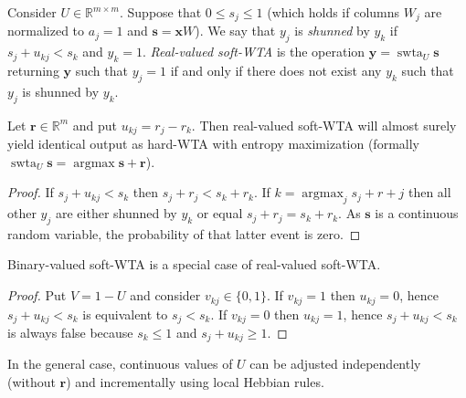 \documentclass[oneside,english,logo]{amuthesis}
\DeclareMathOperator*{\argmax}{argmax}
\DeclareMathOperator{\swta}{swta}
\begin{document}
\begin{definition}
Consider $U \in \mathbb{R}^{m\times m}$. Suppose that $0\le s_j\le 1$ (which holds if columns $W_j$ are normalized to $a_j=1$ and $\boldsymbol{s}=\boldsymbol{x} W$). 
We say that $y_j$ is \textit{shunned} by $y_k$ if $s_j+u_{kj}<s_k$ and $y_k=1$. 
\textit{Real-valued soft-WTA} is the operation $\boldsymbol{y}=\swta_U \boldsymbol{s}$ returning $\boldsymbol{y}$ such that $y_j=1$ if and only if there does not exist any $y_k$ such that  $y_j$ is shunned by $y_k$.
\label{definition:real_valued_swta}
\end{definition}
\begin{theorem}
Let $\boldsymbol{r}\in \mathbb{R}^m$ and put $u_{kj}=r_j-r_k$. Then real-valued soft-WTA will almost surely yield identical output as hard-WTA with entropy maximization (formally $\swta_U \boldsymbol{s}= \argmax \boldsymbol{s}+\boldsymbol{r}$). 
\end{theorem}
\begin{proof}
If $s_j+u_{kj}<s_k$ then $s_j+r_j<s_k+r_k$. If $k=\argmax_j s_j+r+j$ then all other $y_j$ are either shunned by $y_k$ or equal $s_j+r_j=s_k+r_k$. As $\boldsymbol{s}$ is a continuous random variable, the probability of that latter event is zero.
\end{proof}
\begin{theorem}
Binary-valued soft-WTA is a special case of real-valued soft-WTA. 
\end{theorem}
\begin{proof}
Put $V=1-U$ and consider $v_{kj} \in \{0,1\}$. If $v_{kj}=1$ then $u_{kj}=0$, hence $s_j+u_{kj}<s_k$ is equivalent to $s_j<s_k$. If $v_{kj}=0$ then $u_{kj}=1$, hence $s_j+u_{kj}<s_k$ is always false because $s_k \le  1$ and $s_j+u_{kj} \ge 1$. 
\end{proof}

In the general case, continuous values of $U$ can be adjusted independently (without $\boldsymbol{r}$) and incrementally using local Hebbian rules. 
\end{document}
